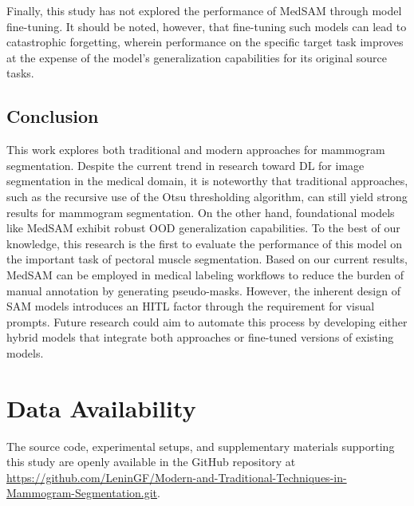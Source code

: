 \documentclass[runningheads]{llncs}
\begin{document}
Finally, this study has not explored the performance of \ac{MedSAM}
through model fine-tuning. It should be noted, however, that
fine-tuning such models can lead to catastrophic forgetting, wherein
performance on the specific target task improves at the expense of the
model's generalization capabilities for its original source tasks.


\subsection{Conclusion}
This work explores both traditional and modern approaches for
mammogram segmentation. Despite the current trend in research toward
\ac{DL} for image segmentation in the medical domain, it is noteworthy
that traditional approaches, such as the recursive use of the Otsu
thresholding algorithm, can still yield strong results for mammogram
segmentation. On the other hand, foundational models like \ac{MedSAM}
exhibit robust \ac{OOD} generalization capabilities. To the best of
our knowledge, this research is the first to evaluate the performance
of this model on the important task of pectoral muscle
segmentation. Based on our current results, \ac{MedSAM} can be
employed in medical labeling workflows to reduce the burden of manual
annotation by generating pseudo-masks. However, the inherent design of
\ac{SAM} models introduces an \ac{HITL} factor through the requirement
for visual prompts. Future research could aim to automate this process
by developing either hybrid models that integrate both approaches or
fine-tuned versions of existing models.

\section*{Data Availability}
The source code, experimental setups, and supplementary materials
supporting this study are openly available in the GitHub repository at
\url{https://github.com/LeninGF/Modern-and-Traditional-Techniques-in-Mammogram-Segmentation.git}.
\end{document}
